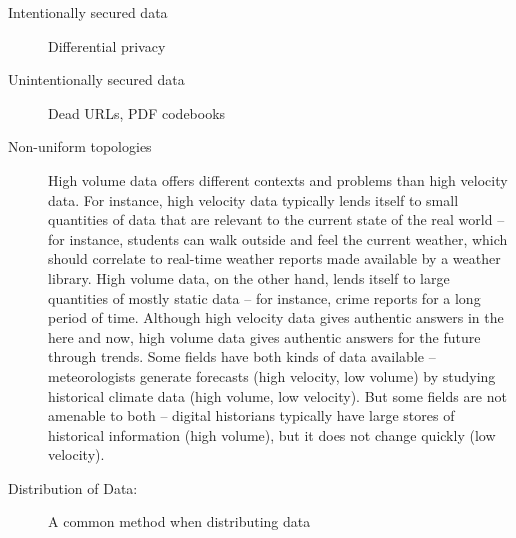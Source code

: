 \begin{description}
\item[Intentionally secured data] Differential privacy
\item[Unintentionally secured data] Dead URLs, PDF codebooks
\item[Non-uniform topologies] High volume data offers different contexts and problems than high velocity data.
For instance, high velocity data typically lends itself to small quantities of data that are relevant to the current state of the real world -- for instance, students can walk outside and feel the current weather, which should correlate to real-time weather reports made available by a weather library.
High volume data, on the other hand, lends itself to large quantities of mostly static data -- for instance, crime reports for a long period of time.
Although high velocity data gives authentic answers in the here and now, high volume data gives authentic answers for the future through trends.
Some fields have both kinds of data available -- meteorologists generate forecasts (high velocity, low volume) by studying historical climate data (high volume, low velocity).
But some fields are not amenable to both -- digital historians typically have large stores of historical information (high volume), but it does not change quickly (low velocity).
\item[Distribution of Data:] A common method when distributing data
\end{description}